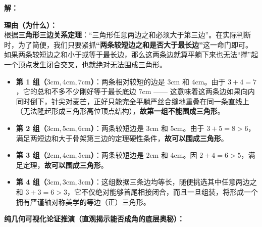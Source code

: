 \vspace{0.4cm}
\textbf{解：}

\textbf{理由（为什么）：} \\
根据\textbf{三角形三边关系定理}：“三角形任意两边之和必须大于第三边”。在实际判断时，为了简便，我们只要紧抓\textbf{“两条较短边之和是否大于最长边”}这一命门即可。如果两条较短边之和小于或等于最长边，那么这两条边就算平躺下来也无法“撑”起一个顶点发生闭合交叉，也就绝对无法围成三角形。
\begin{itemize}
    \item \textbf{第 1 组（$3\text{cm}, 4\text{cm}, 7\text{cm}$）}：两条相对较短的边是 $3\text{cm}$ 和 $4\text{cm}$。由于 $3 + 4 = 7$，它的总和不多不少刚好等于最长底边 $7\text{cm}$ —— 这意味着这两条边如果向内同时倒下，针尖对麦芒，正好只能完全平躺严丝合缝地重叠在同一条直线上（无法隆起形成三角形高位顶点结构），\textbf{故第一组不能围成三角形}。
    \item \textbf{第 2 组（$3\text{cm}, 5\text{cm}, 6\text{cm}$）}：两条较短边是 $3\text{cm}$ 和 $5\text{cm}$。由于 $3 + 5 = 8 > 6$，满足两短边和大于骨架第三边的定理硬性条件，\textbf{故可以围成三角形}。
    \item \textbf{第 3 组（$2\text{cm}, 4\text{cm}, 5\text{cm}$）}：两条较短边是 $2\text{cm}$ 和 $4\text{cm}$。因 $2 + 4 = 6 > 5$，满足定理，\textbf{故可以围成三角形}。
    \item \textbf{第 4 组（$3\text{cm}, 3\text{cm}, 3\text{cm}$）}：这组数据三条边均等长，随便挑选其中任意两边之和 $3 + 3 = 6 > 3$，它不仅绝对能够首尾相接闭合，而且一旦组装，将形成一个拥有严谨轴对称美学的等边（正）三角形。
\end{itemize}

\vspace{0.4cm}
\textbf{纯几何可视化论证推演（直观揭示能否成角的底层奥秘）：}

